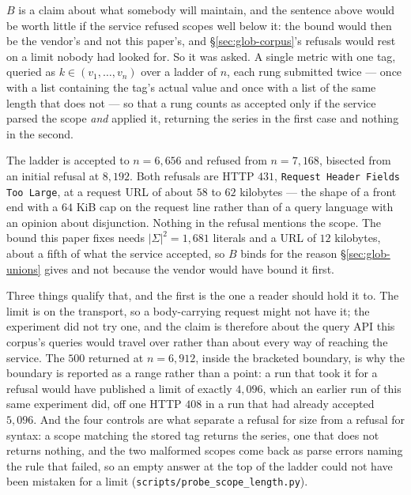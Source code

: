 \begin{remark}\label{rem:scope-length}
$B$ is a claim about what somebody will maintain, and the sentence above would be worth
little if the service refused scopes well below it: the bound would then be the vendor's
and not this paper's, and \S\ref{sec:glob-corpus}'s refusals would rest on a limit
nobody had looked for. So it was asked. A single metric with one tag, queried as
$k \in (v_1,\dots,v_n)$ over a ladder of $n$, each rung submitted twice --- once with a
list containing the tag's actual value and once with a list of the same length that does
not --- so that a rung counts as accepted only if the service parsed the scope
\emph{and} applied it, returning the series in the first case and nothing in the second.

The ladder is accepted to $n=6{,}656$ and refused from $n=7{,}168$, bisected from an
initial refusal at $8{,}192$. Both refusals are HTTP $431$, \texttt{Request Header
Fields Too Large}, at a request URL of about $58$ to $62$ kilobytes --- the shape of a
front end with a $64$ KiB cap on the request line rather than of a query language with
an opinion about disjunction. Nothing in the refusal mentions the scope. The bound this
paper fixes needs $|\Sigma|^{2}=1{,}681$ literals and a URL of $12$ kilobytes, about a
fifth of what the service accepted, so $B$ binds for the reason \S\ref{sec:glob-unions}
gives and not because the vendor would have bound it first.

Three things qualify that, and the first is the one a reader should hold it to. The
limit is on the transport, so a body-carrying request might not have it; the experiment
did not try one, and the claim is therefore about the query API this corpus's queries
would travel over rather than about every way of reaching the service. The $500$ returned at $n=6{,}912$, inside the bracketed boundary, is
why the boundary is reported as a range rather than a point: a run that took it for a
refusal would have published a limit of exactly $4{,}096$, which an earlier run of this
same experiment did, off one HTTP $408$ in a run that had already accepted $5{,}096$.
And the four controls are what separate a refusal for size from a refusal for syntax:
a scope matching the stored tag returns the series, one that does not returns nothing,
and the two malformed scopes come back as parse errors naming the rule that failed, so
an empty answer at the top of the ladder could not have been mistaken for a limit
(\texttt{scripts\slash probe\_scope\_length.py}).
\end{remark}
